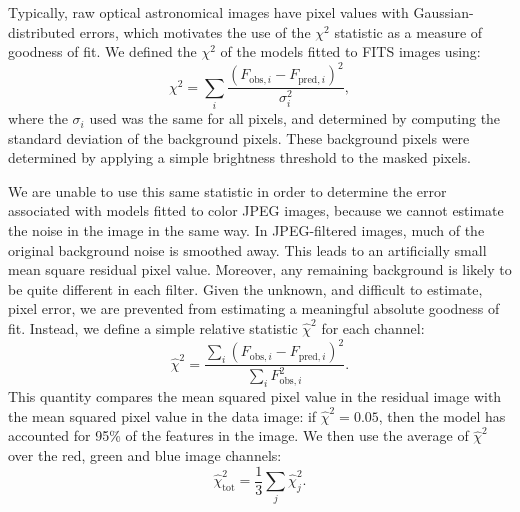 \documentclass[iop]{emulateapj}
\def\rchisq{\hat{\chi}^2}
\begin{document}
Typically, raw optical astronomical images have pixel values with
Gaussian-distributed  errors, which motivates the use of the $\chi^2$ statistic
as a measure of goodness of fit. We defined the $\chi^2$ of the models fitted
to FITS images using:
\begin{equation}
  \chi^2 = \sum_i \frac{\left( F_{\text{obs},i} - F_{\text{pred},i} \right)^2}
                          {\sigma_i^2},
  \label{eq:rchisq}
\end{equation}
where the $\sigma_i$ used was the same for all pixels, and determined by
computing the standard deviation of the background pixels. 
These background pixels were determined by applying a simple brightness 
threshold to the masked pixels.

We are unable to use this same statistic in order to determine the error
associated with models fitted to color JPEG images, because we cannot estimate
the noise in the image in the same way.   In  JPEG-filtered images, much of
the original background noise is smoothed away. This leads to an artificially
small mean square residual  pixel value. Moreover, any remaining background is
likely to be quite different in each filter.  Given the unknown, and difficult
to estimate, pixel error,  we are prevented from estimating a meaningful 
absolute goodness of fit. Instead, we define a simple  relative statistic
$\rchisq$ for each channel:
\begin{equation}
  \rchisq = \frac{\sum_i \left( F_{\text{obs},i} - F_{\text{pred},i} \right)^2}
                          {\sum_i F_{\text{obs},i}^2}.
  \label{eq:rchisq}
\end{equation}
This quantity compares the mean squared pixel value in the residual image  with
the  mean squared pixel value in the data image: if $\rchisq = 0.05$, then the
model has accounted for 95\% of the features in the image.
We then use the average of $\rchisq$ over the red, green and blue image 
channels:
\begin{equation}
	\rchisq_\text{tot} = \frac{1}{3}\sum_j \rchisq_j.
  \label{eq:omega}
\end{equation}
\end{document}
